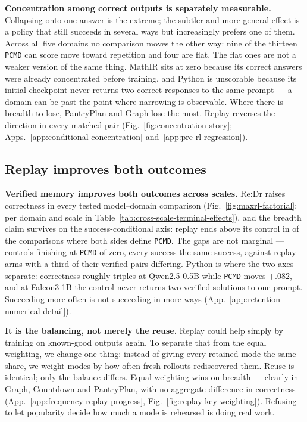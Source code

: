 \documentclass{article}
\newcommand{\1}{\mathbf 1}
\newcommand{\pmd}{\texttt{PCMD}}
\theoremstyle{remark}
\theoremstyle{definition}
\theoremstyle{plain}
\begin{document}
\textbf{Concentration among correct outputs is separately measurable.}
Collapsing onto one answer is the extreme; the subtler and more general effect
is a policy that still succeeds in several ways but increasingly prefers one of
them. Across all five domains no comparison moves the other way: nine of the
thirteen \pmd{} can score move toward repetition and four are flat. The flat
ones are not a weaker version of the same thing. MathIR sits at zero because
its correct answers were already concentrated before training, and Python is
unscorable because its initial checkpoint never returns two correct responses
to the same prompt --- a domain can be past the point where narrowing is
observable. Where there is breadth to lose, PantryPlan and Graph lose the most.
Replay reverses the direction in every matched pair
(Fig.~\ref{fig:concentration-story}; Apps.~\ref{app:conditional-concentration}
and~\ref{app:pre-rl-regression}).


\subsection{Replay improves both outcomes}
\label{sec:results-retention}

\textbf{Verified memory improves both outcomes across scales.}
Re:Dr raises correctness in every tested model--domain comparison
(Fig.~\ref{fig:maxrl-factorial}; per domain and scale in
Table~\ref{tab:cross-scale-terminal-effects}), and the breadth claim survives
on the success-conditional axis: replay ends above its control in \PMDabove{}
of the \PMDblocks{} comparisons where both sides define \pmd{}. The gaps are
not marginal --- controls finishing at \pmd{} of zero, every success the same
success, against replay arms with a third of their verified pairs differing.
Python is where the two axes separate: correctness roughly triples at
Qwen2.5-0.5B while \pmd{} moves $+.082$, and at Falcon3-1B the control never
returns two verified solutions to one prompt.
Succeeding more often is not succeeding in more ways
(App.~\ref{app:retention-numerical-detail}).

\textbf{It is the balancing, not merely the reuse.}
Replay could help simply by training on known-good outputs again. To separate
that from the equal weighting, we change one thing: instead of giving every
retained mode the same share, we weight modes by how often fresh rollouts
rediscovered them. Reuse is identical; only the balance differs. Equal
weighting wins on breadth --- clearly in Graph, Countdown and PantryPlan, with
no aggregate difference in correctness
(App.~\ref{app:frequency-replay-progress},
Fig.~\ref{fig:replay-key-weighting}). Refusing to let popularity decide how
much a mode is rehearsed is doing real work.
\end{document}
